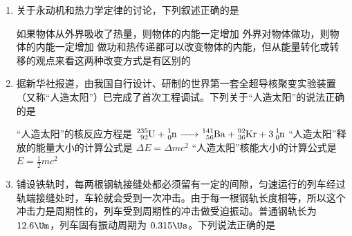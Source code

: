 \documentclass[\gkver]{gaokaozhenti}
\begin{document}
\begin{enumerate}
{卢瑟福提出了原子的核式结构模型}
{贝克勒尔发现了铀和含铀矿物的天然放射现象}
{伦琴发现了 X 射线}


\item
关于永动机和热力学定律的讨论，下列叙述正确的是

{如果物体从外界吸收了热量，则物体的内能一定增加}
{外界对物体做功，则物体的内能一定增加}
{做功和热传递都可以改变物体的内能，但从能量转化或转移的观点来看这两种改变方式是有区别的}


\item
据新华社报道，由我国自行设计、研制的世界第一套全超导核聚变实验装置（又称“人造太阳”）已完成了首次工程调试。下列关于“人造太阳”的说法正确的是

{“人造太阳”的核反应方程是 $\ce{^{235}_{92}U + ^{1}_{0}n -> ^{141}_{56}Ba + ^{92}_{36}Kr + 3^{1}_{0}n}$}
{“人造太阳”释放的能量大小的计算公式是 $\Delta E=\Delta mc^{2}$}
{“人造太阳”核能大小的计算公式是 $E=\frac{1}{2}mc^{2}$}


\item
铺设铁轨时，每两根钢轨接缝处都必须留有一定的间隙，匀速运行的列车经过轨端接缝处时，车轮就会受到一次冲击。由于每一根钢轨长度相等，所以这个冲击力是周期性的，列车受到周期性的冲击做受迫振动。普通钢轨长为 $12.6\Um$，列车固有振动周期为 $0.315\Us$。下列说法正确的是


\end{enumerate}
\end{document}

